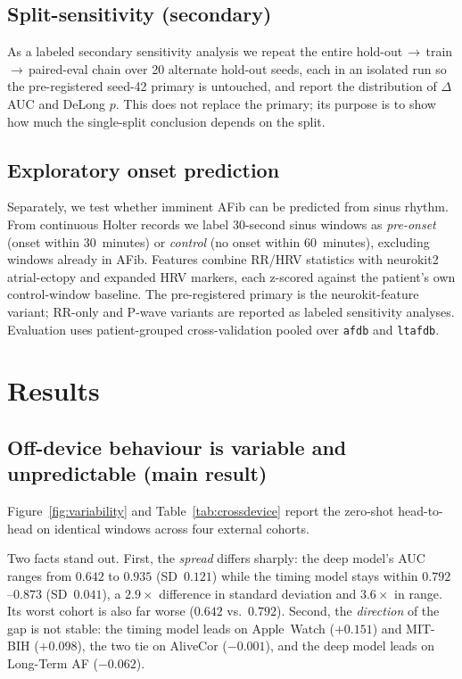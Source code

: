 \documentclass[]{ws-procs9x6}
\begin{document}
\subsection{Split-sensitivity (secondary)}
As a labeled secondary sensitivity analysis we repeat the entire
hold-out\,$\rightarrow$\,train\,$\rightarrow$\,paired-eval chain over 20 alternate
hold-out seeds, each in an isolated run so the pre-registered seed-42 primary is
untouched, and report the distribution of $\Delta$AUC and DeLong $p$. This does not
replace the primary; its purpose is to show how much the single-split conclusion
depends on the split.

\subsection{Exploratory onset prediction}
Separately, we test whether imminent AFib can be predicted from sinus rhythm. From
continuous Holter records we label 30-second sinus windows as \emph{pre-onset}
(onset within 30~minutes) or \emph{control} (no onset within 60~minutes), excluding
windows already in AFib. Features combine RR/HRV statistics with
neurokit2~\cite{makowski2021neurokit} atrial-ectopy and expanded HRV markers, each
z-scored against the patient's own control-window baseline. The pre-registered
primary is the neurokit-feature variant; RR-only and P-wave variants are reported
as labeled sensitivity analyses. Evaluation uses patient-grouped cross-validation
pooled over \texttt{afdb} and \texttt{ltafdb}.

\section{Results}

\subsection{Off-device behaviour is variable and unpredictable (main result)}
Figure~\ref{fig:variability} and Table~\ref{tab:crossdevice} report the zero-shot
head-to-head on identical windows across four external cohorts.

Two facts stand out. First, the \emph{spread} differs sharply: the deep model's
AUC ranges from $0.642$ to $0.935$ (SD~$0.121$) while the timing model stays
within $0.792$--$0.873$ (SD~$0.041$), a $2.9\times$ difference in standard
deviation and $3.6\times$ in range. Its worst cohort is also far worse
($0.642$ vs.\ $0.792$). Second, the \emph{direction} of the gap is not stable:
the timing model leads on Apple~Watch ($+0.151$) and MIT-BIH ($+0.098$), the two
tie on AliveCor ($-0.001$), and the deep model leads on Long-Term AF ($-0.062$).
\end{document}

